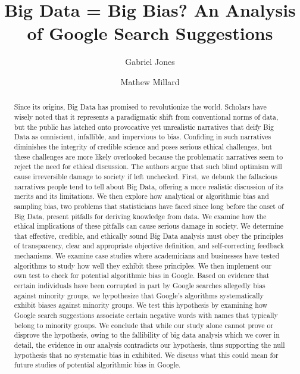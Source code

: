 \documentclass[sigconf]{acmart}
\begin{document}
\title{Big Data = Big Bias? An Analysis of Google Search Suggestions}

\author{Gabriel Jones}

\author{Mathew Millard}


\begin{abstract}
Since its origins, Big Data has promised to revolutionize the world. Scholars have wisely noted that it represents a paradigmatic shift from conventional norms of data, but the public has latched onto provocative yet unrealistic narratives that deify Big Data as omniscient, infallible, and impervious to bias. Confiding in such narratives diminishes the integrity of credible science and poses serious ethical challenges, but these challenges are more likely overlooked because the problematic narratives seem to reject the need for ethical discussion. The authors argue that such blind optimism will cause irreversible damage to society if left unchecked. First, we debunk the fallacious narratives people tend to tell about Big Data, offering a more realistic discussion of its merits and its limitations. We then explore how analytical or algorithmic bias and sampling bias, two problems that statisticians have faced since long before the onset of Big Data, present pitfalls for deriving knowledge from data. We examine how the ethical implications of these pitfalls can cause serious damage in society. We determine that effective, credible, and ethically sound Big Data analysis must obey the principles of transparency, clear and appropriate objective definition, and self-correcting feedback mechanisms. We examine case studies where academicians and businesses have tested algorithms to study how well they exhibit these principles. We then implement our own test to check for potential algorithmic bias in Google. Based on evidence that certain individuals have been corrupted in part by Google searches allegedly bias against minority groups, we hypothesize that Google's algorithms systematically exhibit biases against minority groups. We test this hypothesis by examining how Google search suggestions associate certain negative words with names that typically belong to minority groups. We conclude that while our study alone cannot prove or disprove the hypothesis, owing to the fallibility of big data analysis which we cover in detail, the evidence in our analysis contradicts our hypothesis, thus supporting the null hypothesis that no systematic bias in exhibited. We discuss what this could mean for future studies of potential algorithmic bias in Google.
\end{abstract}
\end{document}
